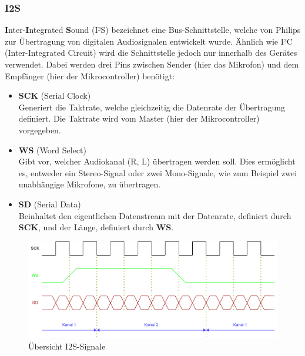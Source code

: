 \documentclass[12pt]{article}
\begin{document}
	
	\subsubsection*{I2S} \label{I2S}
	\textbf{I}nter-\textbf{I}ntegrated \textbf{S}ound (I²S) bezeichnet eine Bus-Schnittstelle, welche von Philips zur Übertragung von digitalen Audiosignalen entwickelt wurde. Ähnlich wie I²C (Inter-Integrated Circuit) wird die Schnittstelle jedoch nur innerhalb des Gerätes verwendet. Dabei werden drei Pins zwischen Sender (hier das Mikrofon) und dem Empfänger (hier der Mikrocontroller) benötigt:
	\begin{itemize}
		\item \textbf{SCK} \quad (Serial Clock) \\
		Generiert die Taktrate, welche gleichzeitig die Datenrate der Übertragung definiert. Die Taktrate wird vom Master (hier der Mikrocontroller) vorgegeben.
		\item \color{green}\textbf{WS}\color{black} \quad (Word Select) \\
		Gibt vor, welcher Audiokanal (R, L) übertragen werden soll. Dies ermöglicht es, entweder ein Stereo-Signal oder zwei Mono-Signale, wie zum Beispiel zwei unabhängige Mikrofone, zu übertragen.
		\item \color{red}\textbf{SD}\color{black} \quad (Serial Data) \\
		Beinhaltet den eigentlichen Datenstream mit der Datenrate, definiert durch \textbf{SCK}, und der Länge, definiert durch \color{green}\textbf{WS}\color{black}.
	\end{itemize}
	\begin{figure}[H]
		\centering
		\includegraphics[width=1\linewidth]{images/BAT_I2S}
		\caption[]{Übersicht I2S-Signale}
		\label{fig:bati2s}
	\end{figure}
	\newpage
\end{document}
